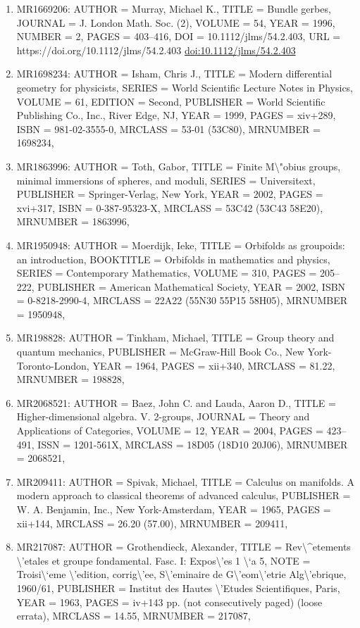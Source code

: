\documentclass[11pt]{article}
\begin{document}
\begin{enumerate}[leftmargin=*]
  \item MR1669206: AUTHOR = Murray, Michael K., TITLE = Bundle gerbes, JOURNAL = J. London Math. Soc. (2), VOLUME = 54, YEAR = 1996, NUMBER = 2, PAGES = 403--416, DOI = 10.1112/jlms/54.2.403, URL = https://doi.org/10.1112/jlms/54.2.403 \href{https://doi.org/10.1112/jlms/54.2.403}{doi:10.1112/jlms/54.2.403}
  \item MR1698234: AUTHOR = Isham, Chris J., TITLE = Modern differential geometry for physicists, SERIES = World Scientific Lecture Notes in Physics, VOLUME = 61, EDITION = Second, PUBLISHER = World Scientific Publishing Co., Inc., River Edge, NJ, YEAR = 1999, PAGES = xiv+289, ISBN = 981-02-3555-0, MRCLASS = 53-01 (53C80), MRNUMBER = 1698234,
  \item MR1863996: AUTHOR = Toth, Gabor, TITLE = Finite M\textbackslash{}"obius groups, minimal immersions of spheres, and moduli, SERIES = Universitext, PUBLISHER = Springer-Verlag, New York, YEAR = 2002, PAGES = xvi+317, ISBN = 0-387-95323-X, MRCLASS = 53C42 (53C43 58E20), MRNUMBER = 1863996,
  \item MR1950948: AUTHOR = Moerdijk, Ieke, TITLE = Orbifolds as groupoids: an introduction, BOOKTITLE = Orbifolds in mathematics and physics, SERIES = Contemporary Mathematics, VOLUME = 310, PAGES = 205--222, PUBLISHER = American Mathematical Society, YEAR = 2002, ISBN = 0-8218-2990-4, MRCLASS = 22A22 (55N30 55P15 58H05), MRNUMBER = 1950948,
  \item MR198828: AUTHOR = Tinkham, Michael, TITLE = Group theory and quantum mechanics, PUBLISHER = McGraw-Hill Book Co., New York-Toronto-London, YEAR = 1964, PAGES = xii+340, MRCLASS = 81.22, MRNUMBER = 198828,
  \item MR2068521: AUTHOR = Baez, John C. and Lauda, Aaron D., TITLE = Higher-dimensional algebra. V. 2-groups, JOURNAL = Theory and Applications of Categories, VOLUME = 12, YEAR = 2004, PAGES = 423--491, ISSN = 1201-561X, MRCLASS = 18D05 (18D10 20J06), MRNUMBER = 2068521,
  \item MR209411: AUTHOR = Spivak, Michael, TITLE = Calculus on manifolds. A modern approach to classical theorems of advanced calculus, PUBLISHER = W. A. Benjamin, Inc., New York-Amsterdam, YEAR = 1965, PAGES = xii+144, MRCLASS = 26.20 (57.00), MRNUMBER = 209411,
  \item MR217087: AUTHOR = Grothendieck, Alexander, TITLE = Rev\textbackslash{}\^{}etements \textbackslash{}'etales et groupe fondamental. Fasc. I: Expos\textbackslash{}'es 1 \textbackslash{}`a 5, NOTE = Troisi\textbackslash{}`eme \textbackslash{}'edition, corrig\textbackslash{}'ee, S\textbackslash{}'eminaire de G\textbackslash{}'eom\textbackslash{}'etrie Alg\textbackslash{}'ebrique, 1960/61, PUBLISHER = Institut des Hautes \textbackslash{}'Etudes Scientifiques, Paris, YEAR = 1963, PAGES = iv+143 pp. (not consecutively paged) (loose errata), MRCLASS = 14.55, MRNUMBER = 217087,

\end{enumerate}
\end{document}

